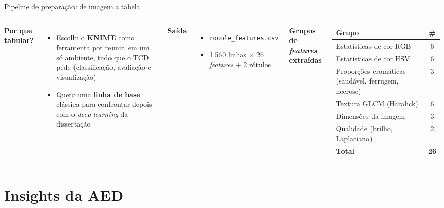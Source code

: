 \documentclass[aspectratio=169,10pt]{beamer}
\begin{document}
\begin{frame}{Pipeline de preparação: de imagem a tabela}
  \begin{columns}[T]
    \textbf{Por que tabular?}
    \begin{itemize}
      \item Escolhi o \textbf{KNIME} como ferramenta por reunir, em um só ambiente, tudo que o TCD pede (classificação, avaliação e visualização)
      \item Quero uma \textbf{linha de base} clássica para confrontar depois com o \textit{deep learning} da dissertação
    \end{itemize}

    \vspace{0.4em}
    \textbf{Saída}
    \begin{itemize}
      \item \texttt{rocole\_features.csv}
      \item 1.560 linhas $\times$ 26 \textit{features} + 2 rótulos
    \end{itemize}

    \textbf{Grupos de \textit{features} extraídas}
    \vspace{0.3em}

    \footnotesize
    \renewcommand{\arraystretch}{1.2}
    \begin{tabularx}{\linewidth}{@{}Xc@{}}
      \toprule
      \textbf{Grupo} & \textbf{\#} \\
      \midrule
      Estatísticas de cor RGB & 6 \\
      Estatísticas de cor HSV & 6 \\
      Proporções cromáticas (saudável, ferrugem, necrose) & 3 \\
      Textura GLCM (Haralick) & 6 \\
      Dimensões da imagem & 3 \\
      Qualidade (brilho, Laplaciano) & 2 \\
      \midrule
      \textbf{Total} & \textbf{26} \\
      \bottomrule
    \end{tabularx}
  \end{columns}
\end{frame}

\section{Insights da AED}
\end{document}
